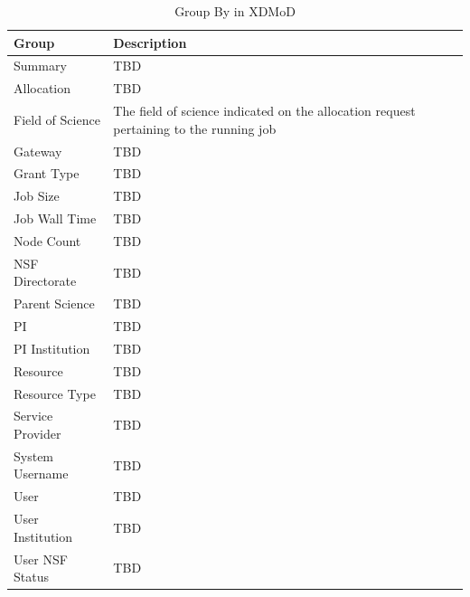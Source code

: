 \documentclass{sig-alternate-05-2015}
\begin{document}
\begin{table}[htb]
  \caption{Group By in XDMoD}
\begin{scriptsize}
\label{T:xdmod3}
 \begin{tabular}{l|l} 
Group & Description \\
\hline
Summary & TBD \\
Allocation & TBD \\
Field of Science & The field of science indicated on the allocation request pertaining to the running job \\
Gateway & TBD \\
Grant Type & TBD \\
Job Size & TBD \\
Job Wall Time & TBD \\
Node Count & TBD \\
NSF Directorate & TBD \\
Parent Science & TBD \\
PI & TBD \\
PI Institution & TBD \\
Resource & TBD \\
Resource Type & TBD \\
Service Provider & TBD \\
System Username & TBD \\
User & TBD \\
User Institution & TBD \\
User NSF Status & TBD \\
\hline
\end{tabular}\\
\end{scriptsize}
\end{table}
\end{document}
